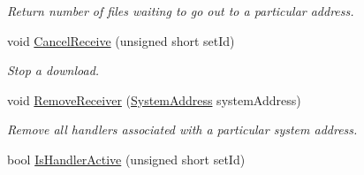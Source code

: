 \begin{DoxyCompactItemize}
\begin{DoxyCompactList}\small\item\em Return number of files waiting to go out to a particular address. \end{DoxyCompactList}\item 
\hypertarget{class_rak_net_1_1_file_list_transfer_a5a266f4cb940bdc3d7a55955baaa53d6}{void \hyperlink{class_rak_net_1_1_file_list_transfer_a5a266f4cb940bdc3d7a55955baaa53d6}{Cancel\-Receive} (unsigned short set\-Id)}\label{class_rak_net_1_1_file_list_transfer_a5a266f4cb940bdc3d7a55955baaa53d6}

\begin{DoxyCompactList}\small\item\em Stop a download. \end{DoxyCompactList}\item 
\hypertarget{class_rak_net_1_1_file_list_transfer_a03ec53d3caf5d7c1471ac643b1340c76}{void \hyperlink{class_rak_net_1_1_file_list_transfer_a03ec53d3caf5d7c1471ac643b1340c76}{Remove\-Receiver} (\hyperlink{struct_rak_net_1_1_system_address}{System\-Address} system\-Address)}\label{class_rak_net_1_1_file_list_transfer_a03ec53d3caf5d7c1471ac643b1340c76}

\begin{DoxyCompactList}\small\item\em Remove all handlers associated with a particular system address. \end{DoxyCompactList}\item 
\hypertarget{class_rak_net_1_1_file_list_transfer_a6ed2ccc350c63e729edce82afb1bd79f}{bool \hyperlink{class_rak_net_1_1_file_list_transfer_a6ed2ccc350c63e729edce82afb1bd79f}{Is\-Handler\-Active} (unsigned short set\-Id)}\label{class_rak_net_1_1_file_list_transfer_a6ed2ccc350c63e729edce82afb1bd79f}


\end{DoxyCompactItemize}

